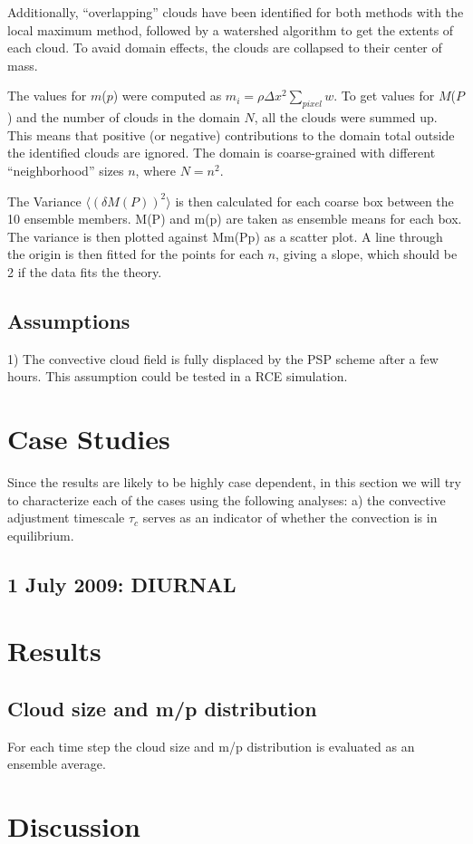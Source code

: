\documentclass[a4paper, 12pt]{article}
\begin{document}
Additionally, ``overlapping'' clouds have been identified for both methods with the local maximum method, followed by a watershed algorithm to get the extents of each cloud. To avaid domain effects, the clouds are collapsed to their center of mass. 

The values for $m$($p$) were computed as  $m_i = \rho \Delta x^2 \sum_{pixel} w$. To get values for $M$($P$) and the number of clouds in the domain $N$, all the clouds were summed up. This means that positive (or negative) contributions to the domain total outside the identified clouds are ignored. The domain is coarse-grained with different ``neighborhood'' sizes $n$, where $N = n^2$. 

The Variance $\langle (\delta M(P))^2 \rangle$ is then calculated for each coarse box between the 10 ensemble members. M(P) and m(p) are taken as ensemble means for each box. The variance is then plotted against Mm(Pp) as a scatter plot. A line through the origin is then fitted for the points for each $n$, giving a slope, which should be 2 if the data fits the theory. 

\subsection{Assumptions}
1) The convective cloud field is fully displaced by the PSP scheme after a few hours. This assumption could be tested in a RCE simulation. 

\section{Case Studies}
Since the results are likely to be highly case dependent, in this section we will try to characterize each of the cases using the following analyses: a) the convective adjustment timescale $\tau_c$ serves as an indicator of whether the convection is in equilibrium. 
\subsection{1 July 2009: DIURNAL}

\section{Results}
\subsection{Cloud size and m/p distribution}
For each time step the cloud size and m/p distribution is evaluated as an ensemble average.

\section{Discussion}



{\small
 }
\end{document}
